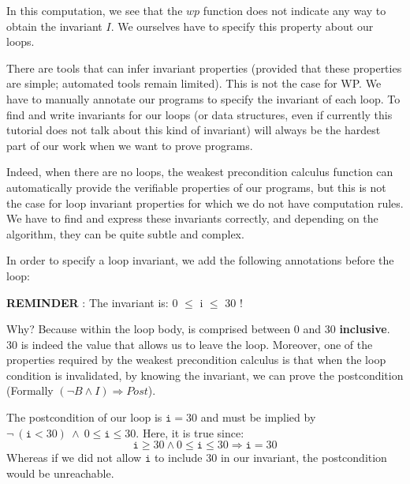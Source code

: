 In this computation, we see that the $wp$ function does not
indicate any way to obtain the invariant $I$. We ourselves have to specify
this property about our loops.





There are tools that can infer invariant properties (provided that
these properties are simple; automated tools remain limited). This is not
the case for WP. We have to manually annotate our programs to
specify the invariant of each loop. To find and write invariants for our
loops (or data structures, even if currently this tutorial does not talk
about this kind of invariant) will always be the hardest part of our work
when we want to prove programs.



Indeed, when there are no loops, the weakest precondition calculus
function can automatically provide the verifiable properties of our
programs, but this is not the case for loop invariant properties for which we
do not have computation rules. We have to find and express these invariants
correctly, and depending on the algorithm, they can be quite subtle and
complex.



In order to specify a loop invariant, we add the following annotations
before the loop:






\begin{Warning}
  \textbf{REMINDER} : The invariant is: 0 $\leq$ i \textbf{$\leq$} 30 !
\end{Warning}


Why? Because within the loop body,  is comprised between 0 and
30 \textbf{inclusive}. 30 is indeed the value that allows us to leave the
loop. Moreover, one of the properties required by the weakest
precondition calculus is that when the loop condition is invalidated, by
knowing the invariant, we can prove the postcondition (Formally
$(\neg B \wedge I) \Rightarrow Post$).

The postcondition of our loop is $\texttt{i} = 30$ and must be implied
by $\neg\ (\texttt{i} < 30)\ \wedge\ 0 \leq \texttt{i} \leq 30$. Here, it is
true since:
$$\texttt{i} \geq 30 \wedge 0 \leq \texttt{i} \leq 30 \Rightarrow \texttt{i} = 30$$
Whereas if we did not allow $\texttt{i}$ to include 30 in our invariant, the postcondition
would be unreachable.



